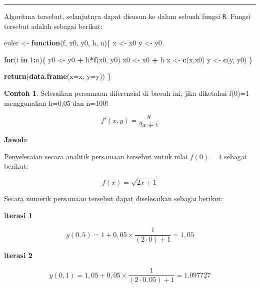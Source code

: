 \documentclass[
]{book}
\newenvironment{Shaded}{\begin{snugshade}}{\end{snugshade}}
\newcommand{\AttributeTok}[1]{\textcolor[rgb]{0.13,0.29,0.53}{#1}}
\newcommand{\ControlFlowTok}[1]{\textcolor[rgb]{0.13,0.29,0.53}{\textbf{#1}}}
\newcommand{\DecValTok}[1]{\textcolor[rgb]{0.00,0.00,0.81}{#1}}
\newcommand{\FunctionTok}[1]{\textcolor[rgb]{0.13,0.29,0.53}{\textbf{#1}}}
\newcommand{\NormalTok}[1]{#1}
\newcommand{\OtherTok}[1]{\textcolor[rgb]{0.56,0.35,0.01}{#1}}
\newcommand{\SpecialCharTok}[1]{\textcolor[rgb]{0.81,0.36,0.00}{\textbf{#1}}}
\theoremstyle{definition}
\theoremstyle{definition}
\newtheorem{example}{Contoh}[chapter]
\theoremstyle{definition}
\theoremstyle{definition}
\theoremstyle{remark}
\begin{document}
\begin{center}\rule{0.5\linewidth}{0.5pt}\end{center}

Algoritma tersebut, selanjutnya dapat disusun ke dalam sebuah fungsi \texttt{R}. Fungsi tersebut adalah sebagai berikut:

\begin{Shaded}
\begin{Highlighting}[]
\NormalTok{euler }\OtherTok{\textless{}{-}} \ControlFlowTok{function}\NormalTok{(f, x0, y0, h, n)\{}
\NormalTok{  x }\OtherTok{\textless{}{-}}\NormalTok{ x0}
\NormalTok{  y }\OtherTok{\textless{}{-}}\NormalTok{ y0}
  
  \ControlFlowTok{for}\NormalTok{(i }\ControlFlowTok{in} \DecValTok{1}\SpecialCharTok{:}\NormalTok{n)\{}
\NormalTok{    y0 }\OtherTok{\textless{}{-}}\NormalTok{ y0 }\SpecialCharTok{+}\NormalTok{ h}\SpecialCharTok{*}\FunctionTok{f}\NormalTok{(x0, y0)}
\NormalTok{    x0 }\OtherTok{\textless{}{-}}\NormalTok{ x0 }\SpecialCharTok{+}\NormalTok{ h}
\NormalTok{    x }\OtherTok{\textless{}{-}} \FunctionTok{c}\NormalTok{(x,x0)}
\NormalTok{    y }\OtherTok{\textless{}{-}} \FunctionTok{c}\NormalTok{(y, y0)}
\NormalTok{  \}}
  
  \FunctionTok{return}\NormalTok{(}\FunctionTok{data.frame}\NormalTok{(}\AttributeTok{x=}\NormalTok{x, }\AttributeTok{y=}\NormalTok{y))}
\NormalTok{\}}
\end{Highlighting}
\end{Shaded}

\begin{example}
\protect\hypertarget{exm:eulerexmp}{}\label{exm:eulerexmp}Selesaikan persamaan diferensial di bawah ini, jika diketahui f(0)=1 menggunakan h=0,05 dan n=100!
\end{example}

\[
f'\left(x,y\right)=\frac{y}{2x+1}
\]

\textbf{Jawab}:

Penyelesaian secara analitik persamaan tersebut untuk nilai \(f\left(0\right)=1\) sebagai berikut:

\[
f\left(x\right)=\sqrt{2x+1}
\]

Secara numerik persamaan tersebut dapat diselesaikan sebagai berikut:

\textbf{iterasi 1}

\[
y\left(0,5\right)=1+0,05\times\frac{1}{\left(2\cdot 0\right)+1}=1,05
\]

\textbf{iterasi 2}

\[
y\left(0,1\right)=1,05+0,05\times\frac{1}{\left(2\cdot0,05\right)+1}=1.097727
\]
\end{document}
